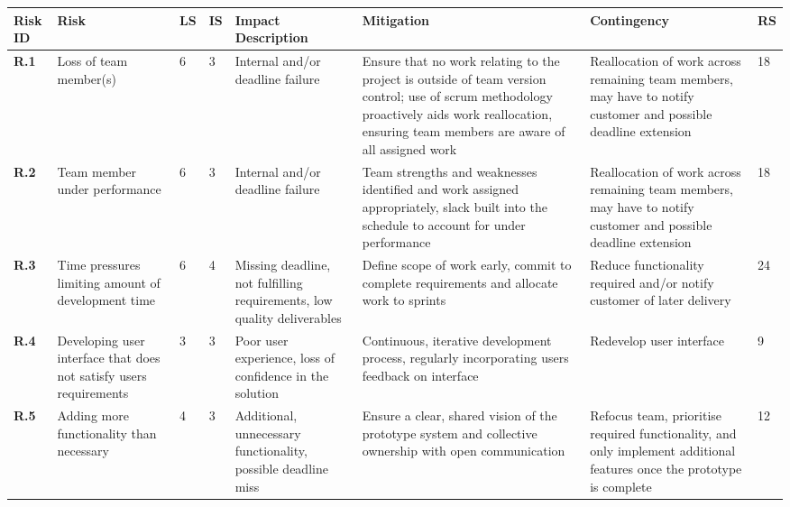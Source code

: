\begin{longtable}[H]{| p{0.65cm} | p{2cm} | p{0.3cm} | p{0.3cm} | p{2.4cm} | p{3cm} | p{2.7cm} | p{0.4cm} |}
  \hline
  \cellcolor{titleColor}\textbf{Risk ID} &
  \cellcolor{titleColor}\textbf{Risk} &
  \cellcolor{titleColor}\textbf{LS} &
  \cellcolor{titleColor}\textbf{IS} &
  \cellcolor{titleColor}\textbf{Impact Description} &
  \cellcolor{titleColor}\textbf{Mitigation} &
  \cellcolor{titleColor}\textbf{Contingency} &
  \cellcolor{titleColor}\textbf{RS}\\
  
  \hline \textbf{R.1}
  & Loss of team member(s)
  & 6
  & 3
  & Internal and/or deadline failure
  & Ensure that no work relating to the project is outside of team
  version control; use of scrum methodology proactively aids work
  reallocation, ensuring team members are aware of all assigned work
  & Reallocation of work across remaining team members, may have to notify customer and possible deadline extension
  & 18 \\
  
  \hline \textbf{R.2}
  & Team member under performance
  & 6
  & 3
  & Internal and/or deadline failure
  & Team strengths and weaknesses identified and work assigned appropriately, slack built into the schedule to account for under performance
  & Reallocation of work across remaining team members, may have to notify customer and possible deadline extension
  & 18 \\
  
  \hline \textbf{R.3}
  & Time pressures limiting amount of development time
  & 6
  & 4
  & Missing deadline, not fulfilling requirements, low quality deliverables
  & Define scope of work early, commit to complete requirements and allocate work to sprints 
  & Reduce functionality required and/or notify customer of later delivery
  & 24\\
  
  \hline \textbf{R.4}
  & Developing user interface that does not satisfy users requirements
  & 3
  & 3
  & Poor user experience, loss of confidence in the solution
  & Continuous, iterative development process, regularly incorporating users feedback on interface
  & Redevelop user interface
  & 9\\
  
  \hline \textbf{R.5}
  & Adding more functionality than necessary
  & 4
  & 3
  & Additional, unnecessary functionality, possible deadline miss
  & Ensure a clear, shared vision of the prototype system and collective ownership with open communication
  & Refocus team, prioritise required functionality, and only implement additional features once the prototype is complete
  & 12\\
  

\end{longtable}
